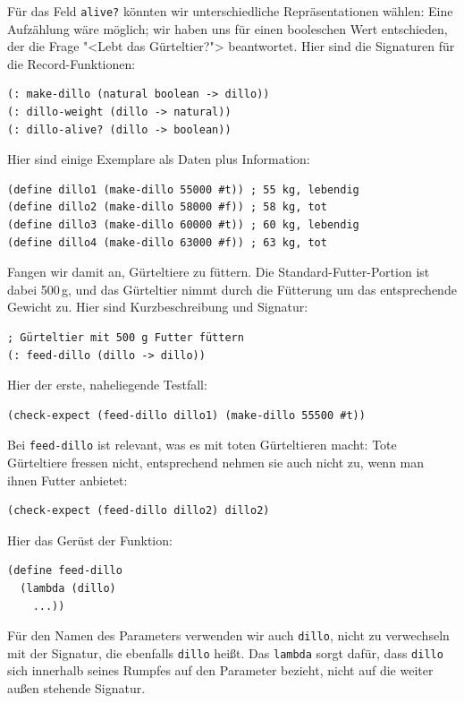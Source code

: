 Für das Feld \lstinline{alive?} könnten wir unterschiedliche Repräsentationen
wählen: Eine Aufzählung wäre möglich; wir haben uns für einen
booleschen Wert entschieden, der die Frage "<Lebt das Gürteltier?">
beantwortet.  Hier sind die Signaturen für die Record-Funktionen:
%
\begin{lstlisting}
(: make-dillo (natural boolean -> dillo))
(: dillo-weight (dillo -> natural))
(: dillo-alive? (dillo -> boolean))
\end{lstlisting}
%
Hier sind einige Exemplare als Daten plus Information:
%
\begin{lstlisting}
(define dillo1 (make-dillo 55000 #t)) ; 55 kg, lebendig 
(define dillo2 (make-dillo 58000 #f)) ; 58 kg, tot
(define dillo3 (make-dillo 60000 #t)) ; 60 kg, lebendig
(define dillo4 (make-dillo 63000 #f)) ; 63 kg, tot
\end{lstlisting}
%
Fangen wir damit an, Gürteltiere zu füttern.  Die
Standard-Futter-Portion ist dabei 500\,g, und das Gürteltier nimmt durch
die Fütterung um das entsprechende Gewicht zu.  Hier sind Kurzbeschreibung
und Signatur:
%
\begin{lstlisting}
; Gürteltier mit 500 g Futter füttern
(: feed-dillo (dillo -> dillo))
\end{lstlisting}
%
Hier der erste, naheliegende Testfall:
%
\begin{lstlisting}
(check-expect (feed-dillo dillo1) (make-dillo 55500 #t))
\end{lstlisting}
%
Bei \lstinline{feed-dillo} ist relevant, was es mit toten
Gürteltieren macht: Tote Gürteltiere fressen nicht, entsprechend
nehmen sie auch nicht zu, wenn man ihnen Futter anbietet:
%
\begin{lstlisting}
(check-expect (feed-dillo dillo2) dillo2)
\end{lstlisting}
%
Hier das Gerüst der Funktion:
\begin{lstlisting}
(define feed-dillo
  (lambda (dillo)
    ...))
\end{lstlisting}
%
Für den Namen des Parameters verwenden wir auch \lstinline{dillo}, nicht
zu verwechseln mit der Signatur, die ebenfalls \lstinline{dillo} heißt. Das
\lstinline{lambda} sorgt dafür, dass \lstinline{dillo} sich innerhalb seines
Rumpfes auf den Parameter bezieht, nicht auf die weiter außen
stehende Signatur.

